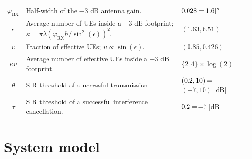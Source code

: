 \documentclass[lettersize,journal]{IEEEtran}
\begin{document}
\begin{table}
\begin{center}
\begin{tabular}{c|p{4.5cm}|p{1.9cm}}
      $\varphi_{\text{RX}}$ & Half-width of the $-3$ dB antenna gain.&$0.028= 1.6 [\degree] \hfill $ \\      
      $\kappa$& Average number of UEs inside a $-3$ dB footprint; $\kappa =\pi \lambda \left({\varphi_{\text{RX}}}h/{\sin^2(\epsilon)}\right)^2$.& $(1.63,6.51)$ \\
      $\upsilon$&Fraction of effective UEs; $\upsilon \propto \sin(\epsilon)$. &$(0.85,0.426)$ \\      
      $\kappa \upsilon$& Average number of effective UEs inside a $-3$ dB footprint.& $\{2,4\}\times \log(2)$ \\
      $\theta$ & SIR threshold of a uccessful transmission.&$(0.2,10)=\hfill$  \break  $(-7,10) \text{ [dB]}$ \\
      $\tau$ & SIR threshold of a successful interference cancellation.& $0.2=\hfill$\break $-7\text{ [dB]}$\\
     \bottomrule
    \end{tabular}
  \end{center}
\end{table}   





\section{System model}
\end{document}
